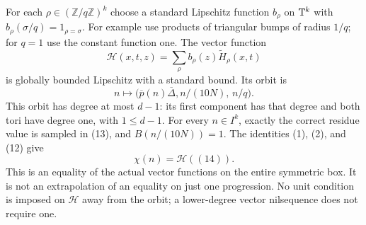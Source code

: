 \documentclass[11pt]{article}
\newcommand{\Z}{\mathbb Z}\newcommand{\R}{\mathbb R}
\begin{document}
For each $\rho\in(\Z/q\Z)^k$ choose a standard Lipschitz function
$b_\rho$ on $\mathbb T^k$ with
$b_\rho(\sigma/q)=1_{\rho=\sigma}$. For example use products of triangular
bumps of radius $1/q$; for $q=1$ use the constant function one.
The vector function
\[
 \mathcal H(x,t,z)=\sum_\rho b_\rho(z)\widetilde H_\rho(x,t)    \tag{13}
\]
is globally bounded Lipschitz with a standard bound. Its orbit is
\[
          n\longmapsto\bigl(\overline p(n)\overline\Delta,
                                      n/(10N),\,n/q\bigr).    \tag{14}
\]
This orbit has degree at most $d-1$: its first component has that degree
and both tori have degree one, with $1\leq d-1$.
For every $n\in I^k$, exactly the correct residue value is sampled in
(13), and $B(n/(10N))=1$. The identities (1), (2), and (12) give
\[
                        \chi(n)=\mathcal H((14)).              \tag{15}
\]
This is an equality of the actual vector functions on the entire symmetric
box. It is not an extrapolation of an equality on just one progression.
No unit condition is imposed on $\mathcal H$ away from the orbit; a
lower-degree vector nilsequence does not require one.
\end{document}
